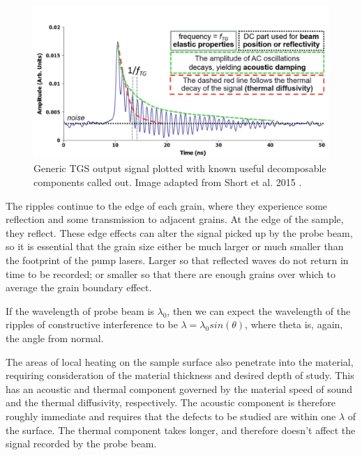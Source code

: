 \begin{figure}[thb]
\begin{center}
\includegraphics[width=\textwidth]{./images/Sample_TGS_output_2.png}
\caption{Generic TGS output signal plotted with known useful decomposable components called out. Image adapted from Short et al. 2015 \cite{Short2015}.}
\label{TGS_sample_output}
\end{center}
\end{figure}

The ripples continue to the edge of each grain, where they experience some reflection and some transmission to adjacent grains. At the edge of the sample, they reflect. These edge effects can alter the signal picked up by the probe beam, so it is essential that the grain size either be much larger or much smaller than the footprint of the pump lasers. Larger so that reflected waves do not return in time to be recorded; or smaller so that there are enough grains over which to average the grain boundary effect.

If the wavelength of probe beam is $\lambda_0$, then we can expect the wavelength of the ripples of constructive interference to be
$\lambda = \lambda_0 sin(\theta)$, where theta is, again, the angle from normal.


The areas of local heating on the sample surface also penetrate into the material, requiring consideration of the material thickness and desired depth of study. This has an acoustic and thermal component governed by the material speed of sound and the thermal diffusivity, respectively. The acoustic component is therefore roughly immediate and requires that the defects to be studied are within one $\lambda$ of the surface. The thermal component takes longer, and therefore doesn't affect the signal recorded by the probe beam.


